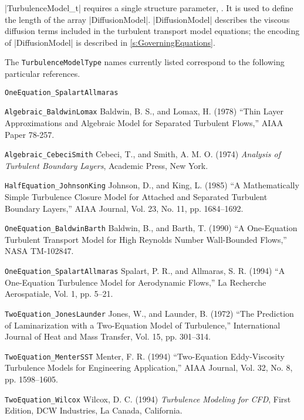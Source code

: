 |TurbulenceModel_t| requires a single structure parameter,
.
It is used to define the length of the array |DiffusionModel|.
|DiffusionModel| describes the viscous diffusion terms included in the
turbulent transport model equations; the encoding of |DiffusionModel| is
described in \autoref{s:GoverningEquations}.

The \texttt{TurbulenceModelType} names currently listed correspond to
the following particular references.

\begin{Ventryi}{\texttt{OneEquation\_SpalartAllmaras}}
\item [\texttt{Algebraic\_BaldwinLomax}]
      Baldwin, B. S., and Lomax, H. (1978) ``Thin Layer Approximations
      and Algebraic Model for Separated Turbulent Flows,'' AIAA Paper
      78-257.
\item [\texttt{Algebraic\_CebeciSmith}]
      Cebeci, T., and Smith, A. M. O. (1974) \textit{Analysis of
      Turbulent Boundary Layers}, Academic Press, New York.
\item [\texttt{HalfEquation\_JohnsonKing}]
      Johnson, D., and King, L. (1985) ``A Mathematically Simple
      Turbulence Closure Model for Attached and Separated Turbulent
      Boundary Layers,'' AIAA Journal, Vol. 23, No. 11, pp. 1684--1692.
\item [\texttt{OneEquation\_BaldwinBarth}]
      Baldwin, B., and Barth, T. (1990) ``A One-Equation Turbulent
      Transport Model for High Reynolds Number Wall-Bounded Flows,'' NASA
      TM-102847.
\item [\texttt{OneEquation\_SpalartAllmaras}]
      Spalart, P. R., and Allmaras, S. R. (1994) ``A One-Equation
      Turbulence Model for Aerodynamic Flows,'' La Recherche
      Aerospatiale, Vol. 1, pp. 5--21.
\item [\texttt{TwoEquation\_JonesLaunder}]
      Jones, W., and Launder, B. (1972) ``The Prediction of
      Laminarization with a Two-Equation Model of Turbulence,''
      International Journal of Heat and Mass Transfer, Vol. 15,
      pp. 301--314.
\item [\texttt{TwoEquation\_MenterSST}]
      Menter, F. R. (1994) ``Two-Equation Eddy-Viscosity Turbulence
      Models for Engineering Application,'' AIAA Journal, Vol. 32,
      No. 8, pp. 1598--1605.
\item [\texttt{TwoEquation\_Wilcox}]
      Wilcox, D. C. (1994) \textit{Turbulence Modeling for CFD}, First
      Edition, DCW Industries, La Canada, California.
\end{Ventryi}

